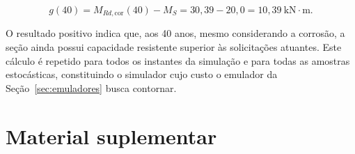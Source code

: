 \begin{appendices}
\begin{equation}
g(40) = M_{Rd,\mathrm{cor}}(40) - M_S = 30{,}39 - 20{,}0 = 10{,}39~\text{kN}\cdot\text{m}.
\end{equation}

O resultado positivo indica que, aos 40 anos, mesmo considerando a corrosão, a seção ainda possui capacidade resistente superior às solicitações atuantes. Este cálculo é repetido para todos os instantes da simulação e para todas as amostras estocásticas, constituindo o simulador cujo custo o emulador da Seção~\ref{sec:emuladores} busca contornar.

\fi

\section{Material suplementar}
\label{app:suplementar}


\end{appendices}
